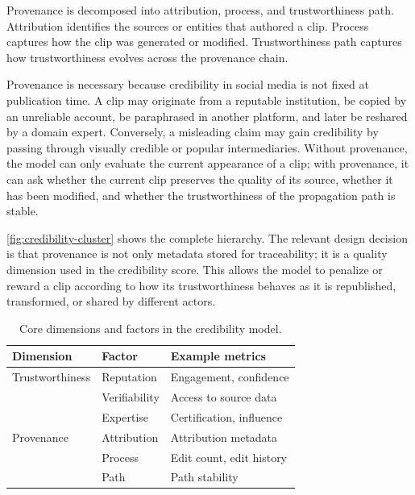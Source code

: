 \documentclass[sigconf, nonacm]{acmart}
\begin{document}
Provenance is decomposed into attribution, process, and trustworthiness path.
Attribution identifies the sources or entities that authored a clip. Process
captures how the clip was generated or modified. Trustworthiness path captures
how trustworthiness evolves across the provenance chain.

Provenance is necessary because credibility in social media is not fixed at
publication time. A clip may originate from a reputable institution, be copied by
an unreliable account, be paraphrased in another platform, and later be reshared
by a domain expert. Conversely, a misleading claim may gain credibility by passing
through visually credible or popular intermediaries. Without provenance, the model
can only evaluate the current appearance of a clip; with provenance, it can ask
whether the current clip preserves the quality of its source, whether it has been
modified, and whether the trustworthiness of the propagation path is stable.

\autoref{fig:credibility-cluster} shows the complete hierarchy. The relevant
design decision is that provenance is not only metadata stored for traceability; it
is a quality dimension used in the credibility score. This allows the model to
penalize or reward a clip according to how its trustworthiness behaves as it is
republished, transformed, or shared by different actors.

\begin{table}[t]
  \caption{Core dimensions and factors in the credibility model.}
  \label{tab:model}
  \begin{tabular}{lll}
    \toprule
    Dimension & Factor & Example metrics\\
    \midrule
    Trustworthiness & Reputation & Engagement, confidence\\
     & Verifiability & Access to source data\\
     & Expertise & Certification, influence\\
    \midrule
    Provenance & Attribution & Attribution metadata\\
     & Process & Edit count, edit history\\
     & Path & Path stability\\
    \bottomrule
  \end{tabular}
\end{table}
\end{document}
